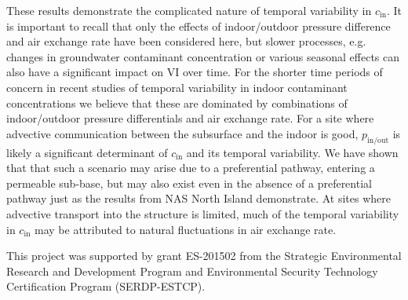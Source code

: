 \documentclass[journal=esthag,manuscript=article]{achemso}
\begin{document}
These results demonstrate the complicated nature of temporal variability in $c_\mathrm{in}$.
It is important to recall that only the effects of indoor/outdoor pressure difference and air exchange rate have been considered here, but slower processes, e.g. changes in groundwater contaminant concentration or various seasonal effects can also have a significant impact on VI over time.
For the shorter time periods of concern in recent studies of temporal variability in indoor contaminant concentrations we believe that these are dominated by combinations of indoor/outdoor pressure differentials and air exchange rate.
For a site where advective communication between the subsurface and the indoor is good, $p_\mathrm{in/out}$ is likely a significant determinant of $c_\mathrm{in}$ and its temporal variability.
We have shown that that such a scenario may arise due to a preferential pathway, entering a permeable sub-base, but may also exist even in the absence of a preferential pathway just as the results from NAS North Island demonstrate.
At sites where advective transport into the structure is limited, much of the temporal variability in $c_\mathrm{in}$ may be attributed to natural fluctuations in air exchange rate.\par

\begin{acknowledgement}
 This project was supported by grant ES-201502 from the Strategic Environmental Research and Development Program and Environmental Security Technology Certification Program (SERDP-ESTCP).
\end{acknowledgement}
\end{document}
